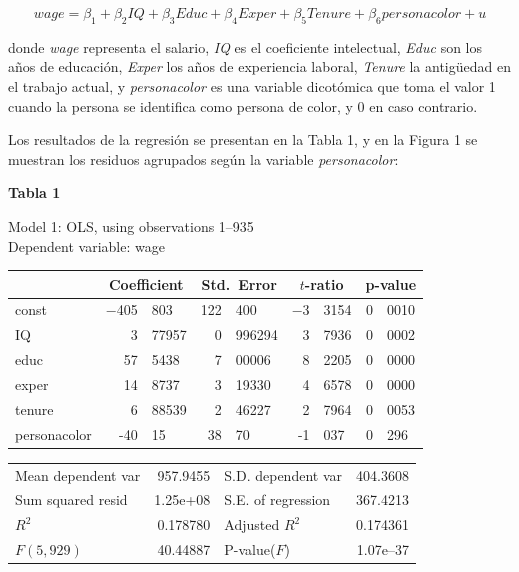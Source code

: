 \documentclass[10pt,a4paper]{article}
\begin{document}
\begin{enumerate}
\begin{equation}
wage = \beta_{1} + \beta_{2}IQ + \beta_{3}Educ + \beta_{4}Exper + \beta_{5}Tenure + \beta_{6}personacolor + u \label{eq:original}
\end{equation}

donde \emph{wage} representa el salario, \emph{IQ} es el coeficiente intelectual,
\emph{Educ} son los años de educación, \emph{Exper} los años de experiencia laboral,
\emph{Tenure} la antigüedad en el trabajo actual, y \emph{personacolor} es una variable dicotómica
que toma el valor 1 cuando la persona se identifica como {persona de color}, y 0 en caso contrario.


Los resultados de la regresión se presentan en la Tabla 1, y en la Figura 1 se muestran los residuos
agrupados según la variable \emph{personacolor}:

\begin{center}
\textbf{Tabla 1}
\end{center}

\begin{center}
Model 1: OLS, using observations 1--935\\ Dependent variable: wage\\
\vspace{1em}
\begin{tabular}{lr@{.}lr@{.}lr@{.}lr@{.}l}
 &  \multicolumn{2}{c}{Coefficient} &   \multicolumn{2}{c}{Std.\ Error} &    \multicolumn{2}{c}{$t$-ratio} &     \multicolumn{2}{c}{p-value} \\
\hline
const &   $-$405&803 &     122&400 &       $-$3&3154 &         0&0010 \\
IQ &   3&77957 &     0&996294 &       3&7936 &         0&0002 \\
educ &   57&5438 &     7&00006 &       8&2205 &         0&0000 \\
exper &   14&8737 &     3&19330 &       4&6578 &         0&0000 \\
tenure &   6&88539 &     2&46227 &       2&7964 &         0&0053 \\
personacolor & -40&15 & 38&70 & -1&037 & 0&296\\
\end{tabular}
\vspace{1ex}

\begin{tabular}{lrlr}
Mean dependent var &  957.9455 & S.D. dependent var &  404.3608 \\
Sum squared resid &  1.25\textrm{e+08} & S.E. of regression &  367.4213 \\
$R^2$ &  0.178780 & Adjusted $R^2$ &  0.174361 \\
$F(5, 929)$ &  40.44887 & P-value($F$) &  1.07\textrm{e--37} \\
\end{tabular}
\end{center}


\end{enumerate}
\end{document}
